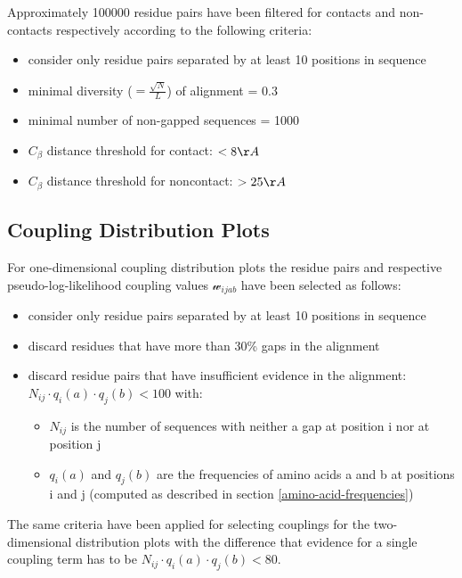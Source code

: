\documentclass[12pt,a4paper,twoside]{book}
\providecommand{\tightlist}{%
  \setlength{\itemsep}{0pt}\setlength{\parskip}{0pt}}
\newcommand{\Cb}{C_\beta}
\newcommand{\wijab}{\mathcal{w}_{ijab}}
\theoremstyle{definition}
\theoremstyle{definition}
\theoremstyle{remark}
\begin{document}
Approximately 100000 residue pairs have been filtered for contacts and
non-contacts respectively according to the following criteria:

\begin{itemize}
\tightlist
\item
  consider only residue pairs separated by at least 10 positions in
  sequence
\item
  minimal diversity (\(=\frac{\sqrt{N}}{L}\)) of alignment = 0.3
\item
  minimal number of non-gapped sequences = 1000
\item
  \(\Cb\) distance threshold for contact: \(<8\AA\)
\item
  \(\Cb\) distance threshold for noncontact: \(>25\AA\)
\end{itemize}

\subsection{Coupling Distribution Plots}\label{method-coupling-profile}

For one-dimensional coupling distribution plots the residue pairs and
respective pseudo-log-likelihood coupling values \(\wijab\) have been
selected as follows:

\begin{itemize}
\tightlist
\item
  consider only residue pairs separated by at least 10 positions in
  sequence
\item
  discard residues that have more than 30\% gaps in the alignment
\item
  discard residue pairs that have insufficient evidence in the
  alignment: \(N_{ij} \cdot q_i(a) \cdot q_j(b) < 100\) with:

  \begin{itemize}
  \tightlist
  \item
    \(N_{ij}\) is the number of sequences with neither a gap at position
    i nor at position j
  \item
    \(q_i(a)\) and \(q_j(b)\) are the frequencies of amino acids a and b
    at positions i and j (computed as described in section
    \ref{amino-acid-frequencies})
  \end{itemize}
\end{itemize}

The same criteria have been applied for selecting couplings for the
two-dimensional distribution plots with the difference that evidence for
a single coupling term has to be
\(N_{ij} \cdot q_i(a) \cdot q_j(b) < 80.\)
\end{document}
